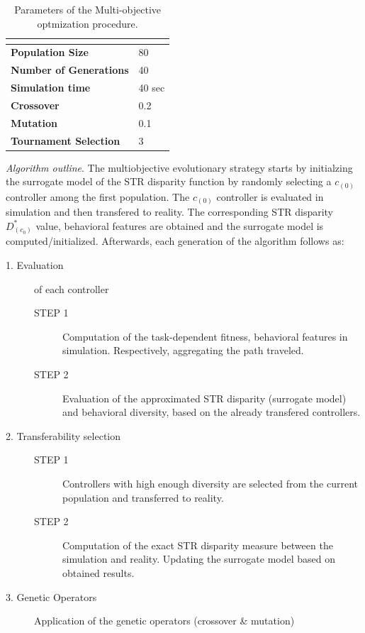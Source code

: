 \begin{table}[H]
\begin{tabular}{ll}
\hline
\textbf{}                      & \textbf{} \\ \hline
\textbf{Population Size}       & 80        \\
\textbf{Number of Generations} & 40        \\
\textbf{Simulation time}       & 40 sec    \\
\textbf{Crossover}             & 0.2       \\
\textbf{Mutation}              & 0.1       \\
\textbf{Tournament Selection}  & 3        
\end{tabular}
\caption{Parameters of the Multi-objective optmization procedure.}
\label{tab:moea_parameters}
\end{table}


\emph{Algorithm outline}. The multiobjective evolutionary strategy starts by initialzing the surrogate model of the STR disparity function by randomly selecting a $c_{(0)}$ controller among the first population. The $c_{(0)}$ controller is evaluated in simulation and then transfered to reality. The corresponding STR disparity $ D^{*}_{(c_0)}$ value, behavioral features are obtained and the surrogate model is computed/initialized. Afterwards, each generation of the algorithm follows as:

\begin{description}
	\item[1. Evaluation] of each controller
		\begin{description}
			\item[STEP 1] Computation of the task-dependent fitness, behavioral features in simulation. Respectively, aggregating the path traveled.
			\item[STEP 2] Evaluation of the approximated STR disparity (surrogate model) and behavioral diversity, based on the already transfered controllers.
		\end{description}
	\item[2. Transferability selection] 
		\begin{description}
			\item[STEP 1] Controllers with high enough diversity are selected from the current population and transferred to reality.
			\item[STEP 2] Computation of the exact STR disparity measure between the simulation and reality. Updating the surrogate model based on obtained results.
		\end{description}
	\item[3. Genetic Operators] Application of the genetic operators (crossover & mutation)
\end{description}


